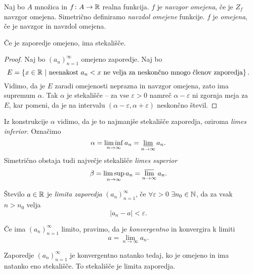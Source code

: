 \documentclass[12pt, a4paper]{article}
\begin{document}
\begin{definicija}
Naj bo $A$ množica in $f\colon A\to\mathbb{R}$ realna funkcija. $f$ je \emph{navzgor omejena}, če je $Z_f$ navzgor omejena. Simetrično definiramo \emph{navzdol omejene} funkcije. $f$ je \emph{omejena}, če je navzgor in navzdol omejena.
\end{definicija}

\begin{izrek}
Če je zaporedje omejeno, ima stekališče.
\end{izrek}

\begin{proof}
Naj bo $(a_n)_{n=1}^\infty$ omejeno zaporedje. Naj bo
\[
E=\left\{x\in\mathbb{R}~\middle\vert~\text{neenakost $a_n<x$ ne velja za neskončno mnogo členov zaporedja}\right\}.
\]
Vidimo, da je $E$ zaradi omejenosti neprazna in navzgor omejena, zato ima supremum $\alpha$. Tak $\alpha$ je stekališče -- za vse $\varepsilon>0$ namreč $\alpha-\varepsilon$ ni zgornja meja za $E$, kar pomeni, da je na intervalu $(\alpha-\varepsilon,\alpha+\varepsilon)$ neskončno števil.
\end{proof}

\begin{opomba}
Iz konstrukcije $\alpha$ vidimo, da je to najmanjše stekališče zaporedja, oziroma \emph{limes inferior}. Označimo
\[
\alpha=\liminf_{n\to\infty}a_n=\varliminf_{n\to\infty}a_n.
\]
Simetrično obstaja tudi največje stekališče \emph{limes superior}
\[
\beta=\limsup_{n\to\infty}a_n=\varlimsup_{n\to\infty}a_n.
\]
\end{opomba}

\begin{definicija}
Število $a\in\mathbb{R}$ je \emph{limita zaporedja} $(a_n)_{n=1}^\infty$, če $\forall\varepsilon>0$ $\exists n_0\in\mathbb{N}$, da za vsak $n>n_0$ velja
\[
|a_n-a|<\varepsilon.
\]
\end{definicija}

\begin{definicija}
Če ima $(a_n)_{n=1}^\infty$ limito, pravimo, da je \emph{konvergentno} in konvergira k limiti
\[
a=\lim_{n\to\infty}a_n.
\]
\end{definicija}

\begin{trditev}
Zaporedje $(a_n)_{n=1}^\infty$ je konvergentno natanko tedaj, ko je omejeno in ima natanko eno stekališče. To stekališče je limita zaporedja.
\end{trditev}
\end{document}
